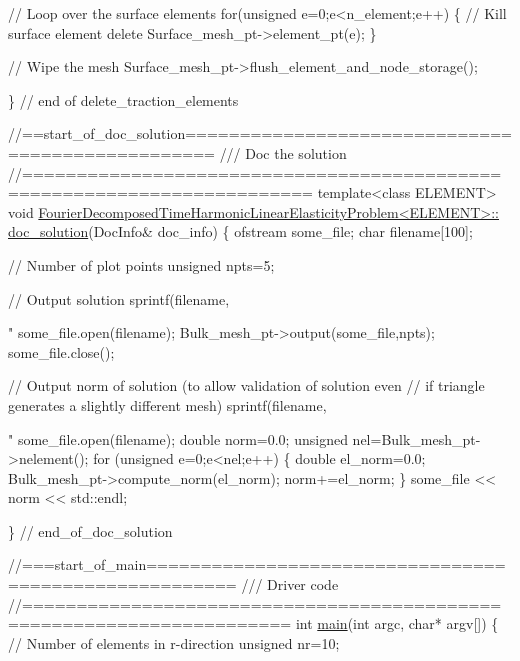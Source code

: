 \begin{DoxyCodeInclude}
 \textcolor{comment}{// Loop over the surface elements}
 \textcolor{keywordflow}{for}(\textcolor{keywordtype}{unsigned} e=0;e<n\_element;e++)
  \{
   \textcolor{comment}{// Kill surface element}
   \textcolor{keyword}{delete} Surface\_mesh\_pt->element\_pt(e);
  \}
 
 \textcolor{comment}{// Wipe the mesh}
 Surface\_mesh\_pt->flush\_element\_and\_node\_storage();

\} \textcolor{comment}{// end of delete\_traction\_elements}


\textcolor{comment}{//==start\_of\_doc\_solution=================================================}\textcolor{comment}{}
\textcolor{comment}{/// Doc the solution}
\textcolor{comment}{}\textcolor{comment}{//========================================================================}
\textcolor{keyword}{template}<\textcolor{keyword}{class} ELEMENT>
\textcolor{keywordtype}{void} \hyperlink{classFourierDecomposedTimeHarmonicLinearElasticityProblem_af328e5b2260377fa7df04b727ca130bd}{FourierDecomposedTimeHarmonicLinearElasticityProblem<ELEMENT>::}
\hyperlink{classFourierDecomposedTimeHarmonicLinearElasticityProblem_af328e5b2260377fa7df04b727ca130bd}{doc\_solution}(DocInfo& doc\_info)
\{ 
 ofstream some\_file;
 \textcolor{keywordtype}{char} filename[100];
 
 \textcolor{comment}{// Number of plot points}
 \textcolor{keywordtype}{unsigned} npts=5; 
 
 \textcolor{comment}{// Output solution }
 sprintf(filename,\textcolor{stringliteral}{"%
 some\_file.open(filename);
 Bulk\_mesh\_pt->output(some\_file,npts);
 some\_file.close();

 \textcolor{comment}{// Output norm of solution (to allow validation of solution even}
 \textcolor{comment}{// if triangle generates a slightly different mesh)}
 sprintf(filename,\textcolor{stringliteral}{"%
 some\_file.open(filename);   
 \textcolor{keywordtype}{double} norm=0.0;
 \textcolor{keywordtype}{unsigned} nel=Bulk\_mesh\_pt->nelement();
 \textcolor{keywordflow}{for} (\textcolor{keywordtype}{unsigned} e=0;e<nel;e++)
  \{
   \textcolor{keywordtype}{double} el\_norm=0.0;
   Bulk\_mesh\_pt->compute\_norm(el\_norm);
   norm+=el\_norm;
  \}
 some\_file << norm << std::endl;


\} \textcolor{comment}{// end\_of\_doc\_solution   }


\textcolor{comment}{//===start\_of\_main======================================================}\textcolor{comment}{}
\textcolor{comment}{/// Driver code }
\textcolor{comment}{}\textcolor{comment}{//======================================================================}
\textcolor{keywordtype}{int} \hyperlink{cylinder_8cc_a0ddf1224851353fc92bfbff6f499fa97}{main}(\textcolor{keywordtype}{int} argc, \textcolor{keywordtype}{char}* argv[]) 
\{
 \textcolor{comment}{// Number of elements in r-direction}
 \textcolor{keywordtype}{unsigned} nr=10;
 
}}
\end{DoxyCodeInclude}
